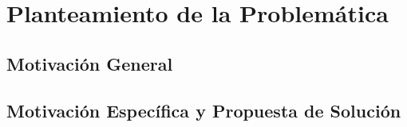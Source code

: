 
\chapter{Planteamiento de la Problemática}  %

\ifpdf
    \graphicspath{{Chapter1/Figs/Raster/}{Chapter1/Figs/PDF/}{Chapter1/Figs/}}
\else
    \graphicspath{{Chapter1/Figs/Vector/}{Chapter1/Figs/}}
\fi


\section{Motivación General}
\section{Motivación Específica y Propuesta de Solución}
